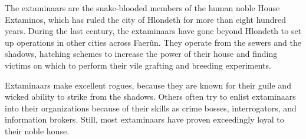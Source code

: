 
The extaminaars are the snake-blooded members of the human noble House Extaminos, which has ruled the city of Hlondeth for more than eight hundred years. During the last century, the extaminaars have gone beyond Hlondeth to set up operations in other cities across Faerûn. They operate from the sewers and the shadows, hatching schemes to increase the power of their house and finding victims on which to perform their vile grafting and breeding experiments.

Extaminaars make excellent rogues, because they are known for their guile and wicked ability to strike from the shadows. Others often try to enlist extaminaars into their organizations because of their skills as crime bosses, interrogators, and information brokers. Still, most extaminaars have proven exceedingly loyal to their noble house.

